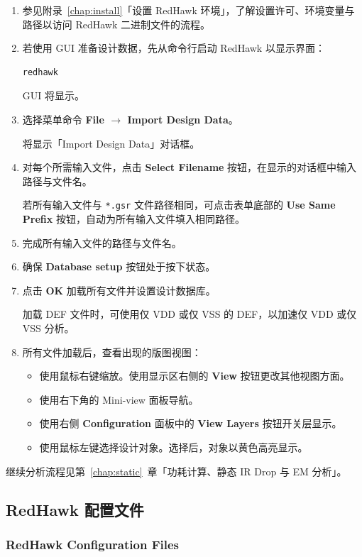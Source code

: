 \begin{enumerate}
  \item 参见附录~\ref{chap:install}「设置 RedHawk 环境」，了解设置许可、环境变量与路径以访问 RedHawk 二进制文件的流程。
  \item 若使用 GUI 准备设计数据，先从命令行启动 RedHawk 以显示界面：
\begin{lstlisting}
redhawk
\end{lstlisting}
  GUI 将显示。
  \item 选择菜单命令 \textbf{File $\rightarrow$ Import Design Data}。

  将显示「Import Design Data」对话框。
  \item 对每个所需输入文件，点击 \textbf{Select Filename} 按钮，在显示的对话框中输入路径与文件名。

  若所有输入文件与 \texttt{*.gsr} 文件路径相同，可点击表单底部的 \textbf{Use Same Prefix} 按钮，自动为所有输入文件填入相同路径。
  \item 完成所有输入文件的路径与文件名。
  \item 确保 \textbf{Database setup} 按钮处于按下状态。
  \item 点击 \textbf{OK} 加载所有文件并设置设计数据库。

  加载 DEF 文件时，可使用仅 VDD 或仅 VSS 的 DEF，以加速仅 VDD 或仅 VSS 分析。
  \item 所有文件加载后，查看出现的版图视图：
  \begin{itemize}
    \item 使用鼠标右键缩放。使用显示区右侧的 \textbf{View} 按钮更改其他视图方面。
    \item 使用右下角的 Mini-view 面板导航。
    \item 使用右侧 \textbf{Configuration} 面板中的 \textbf{View Layers} 按钮开关层显示。
    \item 使用鼠标左键选择设计对象。选择后，对象以黄色高亮显示。
  \end{itemize}
\end{enumerate}

\begin{seeAlsoBox}
继续分析流程见第~\ref{chap:static}~章「功耗计算、静态 IR Drop 与 EM 分析」。
\end{seeAlsoBox}

\subsection{RedHawk 配置文件}
\subsubsection*{RedHawk Configuration Files}

